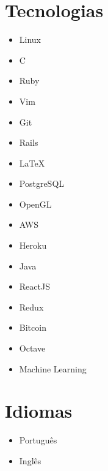 \documentclass[a4paper]{simplecv}
\begin{document}
\section{Tecnologias}

\begin{multicols}{4}
	\raggedcolumns
	\begin{itemize}
		\item Linux
		\item C
		\item Ruby
		\item Vim
		\item Git
		\item Rails
		\item \LaTeX{}
		\item PostgreSQL
		\item OpenGL
		\item AWS
		\item Heroku
		\item Java
		\item ReactJS
		\item Redux
		\item Bitcoin
		\item Octave
		\item Machine Learning
	\end{itemize}
\end{multicols}

\section{Idiomas}

\begin{multicols}{4}
	\raggedcolumns
	\begin{itemize}
		\item Português
		\item Inglês
	\end{itemize}
\end{multicols}

%
\end{document}
